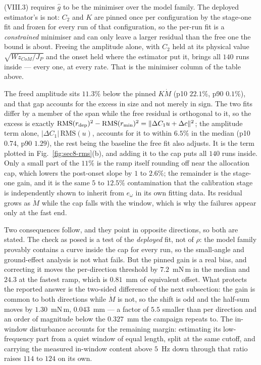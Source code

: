 \documentclass[10pt]{article}
\newcommand{\Mdot}{\dot M}
\begin{document}
(VIII.3) requires $\hat g$ to be the minimiser over the model family. The deployed estimator's is not: $C_2$ and $K$ are pinned
once per configuration by the stage-one fit and frozen for every run of
that configuration, so the per-run fit is a \emph{constrained} minimiser
and can only leave a larger residual than the free one the bound is
about. Freeing the amplitude alone, with $C_2$ held at its physical
value $\sqrt{Wz_{CoM}/J_P}$ and the onset held where the estimator put
it, brings all $140$ runs inside --- every one, at every rate. That is
the minimiser column of the table above.

The freed amplitude sits $11.3\%$ below the pinned $K\Mdot$ (p10 $22.1\%$,
p90 $0.1\%$), and that gap accounts for the excess in size and not merely
in sign. The two fits differ by a member of the span while the free
residual is orthogonal to it, so the excess is exactly
$\mathrm{RMS}(r_{\rm dep})^2 - \mathrm{RMS}(r_{\rm min})^2 =
\|\Delta C_1 u + \Delta c\|^2$; the amplitude term alone,
$|\Delta C_1|\,\mathrm{RMS}(u)$, accounts for it to within $6.5\%$ in
the median (p10 $0.74$, p90 $1.29$), the rest being the baseline the
free fit also adjusts. It is the term plotted in
Fig.~\ref{fig:sec8-rms}(b), and adding it to the cap puts all $140$ runs
inside. Only a small part of the $11\%$ is the ramp
itself rounding off near the allocation cap, which lowers the post-onset
slope by $1$ to $2.6\%$; the remainder is the stage-one gain, and it is
the same $5$ to $12.5\%$ contamination that the calibration stage is
independently shown to inherit from $e_\omega$ in its own fitting data.
Its residual grows as $\Mdot$ while the cap falls with the window, which
is why the failures appear only at the fast end.

Two consequences follow, and they point in opposite directions, so both
are stated. The check as posed is a test of the \emph{deployed} fit, not
of $\rho$: the model family provably contains a curve inside the cap for
every run, so the small-angle and ground-effect analysis is not what
fails. But the pinned gain is a real bias, and correcting it moves the
per-direction threshold by $7.2$~mN\,m in the median and $24.3$ at the
fastest ramp, which is $0.81$~mm of equivalent offset. What protects the
reported answer is the two-sided difference of the next subsection: the
gain is common to both directions while $\Mdot$ is not, so the shift is
odd and the half-sum moves by $1.30$~mN\,m, $0.043$~mm --- a factor of
$5.5$ smaller than per direction and an order of magnitude below the
$0.327$~mm the campaign repeats to. The in-window disturbance accounts
for the remaining margin: estimating its low-frequency part from a quiet
window of equal length, split at the same cutoff, and carrying the
measured in-window content above $5$~Hz down through that ratio raises
$114$ to $124$ on its own.
\end{document}
